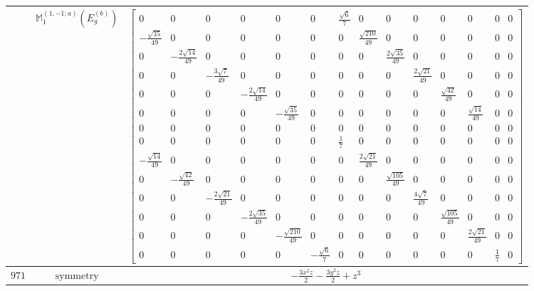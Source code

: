 \documentclass[fleqn,8pt,landscape]{jsarticle}
\begin{document}
\begin{longtable}{ccc}
$  $ & $ \mathbb{M}_{1}^{(1,-1;a)}(E_{g}^{(b)}) $ & $ \begin{bmatrix} 0 & 0 & 0 & 0 & 0 & 0 & \frac{\sqrt{6}}{7} & 0 & 0 & 0 & 0 & 0 & 0 & 0 \\ - \frac{\sqrt{35}}{49} & 0 & 0 & 0 & 0 & 0 & 0 & \frac{\sqrt{210}}{49} & 0 & 0 & 0 & 0 & 0 & 0 \\ 0 & - \frac{2 \sqrt{14}}{49} & 0 & 0 & 0 & 0 & 0 & 0 & \frac{2 \sqrt{35}}{49} & 0 & 0 & 0 & 0 & 0 \\ 0 & 0 & - \frac{3 \sqrt{7}}{49} & 0 & 0 & 0 & 0 & 0 & 0 & \frac{2 \sqrt{21}}{49} & 0 & 0 & 0 & 0 \\ 0 & 0 & 0 & - \frac{2 \sqrt{14}}{49} & 0 & 0 & 0 & 0 & 0 & 0 & \frac{\sqrt{42}}{49} & 0 & 0 & 0 \\ 0 & 0 & 0 & 0 & - \frac{\sqrt{35}}{49} & 0 & 0 & 0 & 0 & 0 & 0 & \frac{\sqrt{14}}{49} & 0 & 0 \\ 0 & 0 & 0 & 0 & 0 & 0 & 0 & 0 & 0 & 0 & 0 & 0 & 0 & 0 \\ 0 & 0 & 0 & 0 & 0 & 0 & \frac{1}{7} & 0 & 0 & 0 & 0 & 0 & 0 & 0 \\ - \frac{\sqrt{14}}{49} & 0 & 0 & 0 & 0 & 0 & 0 & \frac{2 \sqrt{21}}{49} & 0 & 0 & 0 & 0 & 0 & 0 \\ 0 & - \frac{\sqrt{42}}{49} & 0 & 0 & 0 & 0 & 0 & 0 & \frac{\sqrt{105}}{49} & 0 & 0 & 0 & 0 & 0 \\ 0 & 0 & - \frac{2 \sqrt{21}}{49} & 0 & 0 & 0 & 0 & 0 & 0 & \frac{4 \sqrt{7}}{49} & 0 & 0 & 0 & 0 \\ 0 & 0 & 0 & - \frac{2 \sqrt{35}}{49} & 0 & 0 & 0 & 0 & 0 & 0 & \frac{\sqrt{105}}{49} & 0 & 0 & 0 \\ 0 & 0 & 0 & 0 & - \frac{\sqrt{210}}{49} & 0 & 0 & 0 & 0 & 0 & 0 & \frac{2 \sqrt{21}}{49} & 0 & 0 \\ 0 & 0 & 0 & 0 & 0 & - \frac{\sqrt{6}}{7} & 0 & 0 & 0 & 0 & 0 & 0 & \frac{1}{7} & 0 \end{bmatrix} $ \\ \hline
$ 971 $ & $ \text{symmetry} $ & $ - \frac{3 x^{2} z}{2} - \frac{3 y^{2} z}{2} + z^{3} $ \\

\end{longtable}
\end{document}
